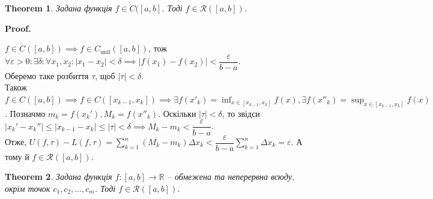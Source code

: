 \documentclass[a4paper, 10pt]{article}
\makeatletter
\def\huge{\displaystyle}
\theoremstyle{theoremdd}
\newtheorem{theorem}{Theorem}[subsection]
\theoremstyle{theoremdd}
\theoremstyle{theoremdd}
\theoremstyle{theoremdd}
\theoremstyle{theoremdd}
\theoremstyle{theoremdd}
\theoremstyle{theoremdd}
\theoremstyle{theoremdd}
\theoremstyle{theoremdd}
\renewenvironment{proof}[1][Proof.\\]{\par
\pushQED{\hfill \qed}%
\normalfont \topsep6\p@\@plus6\p@\relax
\trivlist
\item\relax
{\bfseries
#1\@addpunct{.}}\hspace\labelsep\ignorespaces
}{%
\popQED\endtrivlist\@endpefalse
}
\makeatother
\begin{document}
\begin{theorem}
Задана функція $f \in C([a,b]$. Тоді $f \in \mathcal{R}([a,b])$.
\end{theorem}

\begin{proof}
$f \in C([a,b]) \implies f \in C_{\text{unif}}([a,b])$, тож $\forall \varepsilon > 0: \exists \delta: \forall x_1,x_2: |x_1-x_2| < \delta \implies |f(x_1)-f(x_2)| < \dfrac{\varepsilon}{b-a}$.\\
Оберемо таке розбиття $\tau$, щоб $|\tau| < \delta$.\\
Також $f \in C([a,b]) \implies f \in C([x_{k-1},x_k]) \implies \huge \exists f(x'_k) = \inf_{x \in [x_{k-1},x_k]} f(x), \exists f(x''_k) = \sup_{x \in [x_{k-1},x_k]} f(x)$. Позначмо $m_k = f(x_k'), M_k = f(x''_k)$. Оскільки $|\tau| < \delta$, то звідси $|x_k'-x_k''| \leq |x_{k-1}-x_k| \leq |\tau| < \delta \implies M_k - m_k < \dfrac{\varepsilon}{b-a}$.\\
Отже, $U(f,\tau) - L(f,\tau) = \huge\sum_{k=1}^n (M_k-m_k)\Delta x_k < \dfrac{\varepsilon}{b-a} \sum_{k=1}^n \Delta x_k = \varepsilon$. А тому й $f \in \mathcal{R}([a,b])$.
\end{proof}

\begin{theorem}
Задана функція $f \colon [a,b] \to \mathbb{R}$ -- обмежена та неперервна всюду, окрім точок $c_1,c_2,\dots,c_m$. Тоді $f \in \mathcal{R}([a,b])$.
\end{theorem}
\end{document}
